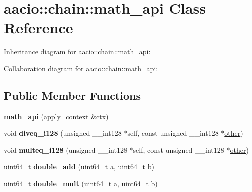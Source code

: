 \hypertarget{classaacio_1_1chain_1_1math__api}{}\section{aacio\+:\+:chain\+:\+:math\+\_\+api Class Reference}
\label{classaacio_1_1chain_1_1math__api}


Inheritance diagram for aacio\+:\+:chain\+:\+:math\+\_\+api\+:


Collaboration diagram for aacio\+:\+:chain\+:\+:math\+\_\+api\+:
\subsection*{Public Member Functions}
\begin{DoxyCompactItemize}
\item 
\mbox{\label{classaacio_1_1chain_1_1math__api_a96e04fa8a322efe4e57d864e23f7873d}} 
{\bfseries math\+\_\+api} (\mbox{\hyperlink{classaacio_1_1chain_1_1apply__context}{apply\+\_\+context}} \&ctx)
\item 
\mbox{\label{classaacio_1_1chain_1_1math__api_a3e0d885268a7add4502de31c3dcc9d77}} 
void {\bfseries diveq\+\_\+i128} (unsigned \+\_\+\+\_\+int128 $\ast$self, const unsigned \+\_\+\+\_\+int128 $\ast$\mbox{\hyperlink{structother}{other}})
\item 
\mbox{\label{classaacio_1_1chain_1_1math__api_abdd7112ba35de72ce3822d3151be9db9}} 
void {\bfseries multeq\+\_\+i128} (unsigned \+\_\+\+\_\+int128 $\ast$self, const unsigned \+\_\+\+\_\+int128 $\ast$\mbox{\hyperlink{structother}{other}})
\item 
\mbox{\label{classaacio_1_1chain_1_1math__api_a07360452175e4b861b480f42488e19da}} 
uint64\+\_\+t {\bfseries double\+\_\+add} (uint64\+\_\+t a, uint64\+\_\+t b)
\item 
\mbox{\label{classaacio_1_1chain_1_1math__api_a15814b864da7f9382dad84cd7bc03e4f}} 
uint64\+\_\+t {\bfseries double\+\_\+mult} (uint64\+\_\+t a, uint64\+\_\+t b)
\item 
\mbox{\label{classaacio_1_1chain_1_1math__api_a454ba2d741a32aa9c78059301906193f}} 

\end{DoxyCompactItemize}
